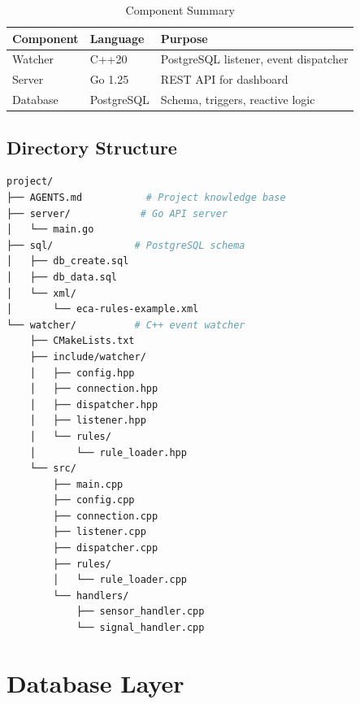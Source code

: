 \documentclass[12pt,a4paper]{article}
\begin{document}
\begin{figure}[H]
\centering
{}
\end{figure}
\bigskip

\begin{table}[H]
\centering
\begin{tabular}{lll} \toprule
Component & Language & Purpose \\ \midrule
Watcher & C++20 & PostgreSQL listener, event dispatcher \\
Server & Go 1.25 & REST API for dashboard \\
Database & PostgreSQL & Schema, triggers, reactive logic \\ \bottomrule
\end{tabular}
\caption{Component Summary}
\end{table}

\subsection{Directory Structure}

\begin{lstlisting}[language=bash,style=mystyle]
project/
├── AGENTS.md           # Project knowledge base
├── server/            # Go API server
│   └── main.go
├── sql/              # PostgreSQL schema
│   ├── db_create.sql
│   ├── db_data.sql
│   └── xml/
│       └── eca-rules-example.xml
└── watcher/          # C++ event watcher
    ├── CMakeLists.txt
    ├── include/watcher/
    │   ├── config.hpp
    │   ├── connection.hpp
    │   ├── dispatcher.hpp
    │   ├── listener.hpp
    │   └── rules/
    │       └── rule_loader.hpp
    └── src/
        ├── main.cpp
        ├── config.cpp
        ├── connection.cpp
        ├── listener.cpp
        ├── dispatcher.cpp
        ├── rules/
        │   └── rule_loader.cpp
        └── handlers/
            ├── sensor_handler.cpp
            └── signal_handler.cpp
\end{lstlisting}

\section{Database Layer}
\end{document}
